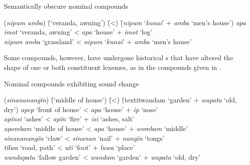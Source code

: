 \ea%
    \label{ex:nouns:44}
          Semantically obscure nominal compounds\\
\begin{tabbing}
{(\textit{nipum amba})} \= {(‘veranda, awning’)} \= {(<)} \= {(\textit{nipum} ‘\textit{kunai}’ + \textit{amba} ‘men’s house’)}\kill
{\textit{apa imot}} \> {‘veranda, awning’} \> {<} \> {\textit{apa} ‘house’ + \textit{imot} ‘log’}\\
{\textit{nipum amba}} \> {‘grassland’} \> {<} \> {\textit{nipum} ‘\textit{kunai}’ + \textit{amba} ‘men’s house’}
\end{tabbing}
    \z

Some compounds, however, have undergone historical s that have altered the shape of one or both constituent lexemes, as in the compounds given in .

\newpage

\ea%
    \label{ex:nouns:45}
          Nominal compounds exhibiting sound change\\
\begin{tabbing}
{(\textit{sinananangïn})} \= {(‘middle of house’)} \= {(<)} \= {(textit{wandam} ‘garden’ + \textit{wapata} ‘old, dry’)}\kill
{\textit{apep}} \> {‘front of house’} \> {<} \> {\textit{apa} ‘house’ + \textit{ip} ‘nose’}\\
{\textit{apïnsi}} \> {‘ashes’} \> {<} \>  {\textit{apïn} ‘fire’ + \textit{isi} ‘ashes, salt’}\\
{\textit{apombam}} \> {‘middle of house’} \> {<} \> {\textit{apa} ‘house’ + \textit{wombam} ‘middle’}\\
{\textit{sinananangïn}} \> {‘claw’} \> {<} \> {\textit{sinanan} ‘nail’ + \textit{nangïn} ‘tongs’}\\
{\textit{tïlwa}} \> {‘road, path’} \> {<} \> {\textit{utï} ‘foot’ + \textit{luwa} ‘place’}\\
{\textit{wandapata}} \> {‘fallow garden’} \> {<} \> {\textit{wandam} ‘garden’ + \textit{wapata} ‘old, dry’}
\end{tabbing}
    \z

